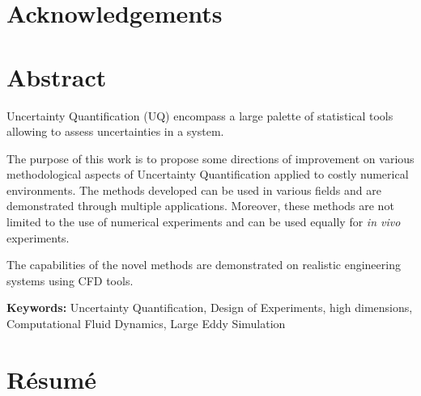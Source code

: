 
\cleardoublepage
\section*{Acknowledgements}





\newpage
\section*{Abstract}

Uncertainty Quantification (UQ) encompass a large palette of statistical tools allowing to assess uncertainties in a system.

The purpose of this work is to propose some directions of improvement on various methodological aspects of Uncertainty Quantification applied to costly numerical environments. The methods developed can be used in various fields and are demonstrated through multiple applications. Moreover, these methods are not limited to the use of numerical experiments and can be used equally for \emph{in vivo} experiments.

The capabilities of the novel methods are demonstrated on realistic engineering systems using CFD tools.


\textbf{Keywords:} Uncertainty Quantification, Design of Experiments, high dimensions, Computational Fluid Dynamics, Large Eddy Simulation

\newpage
{}
\section*{Résumé}


